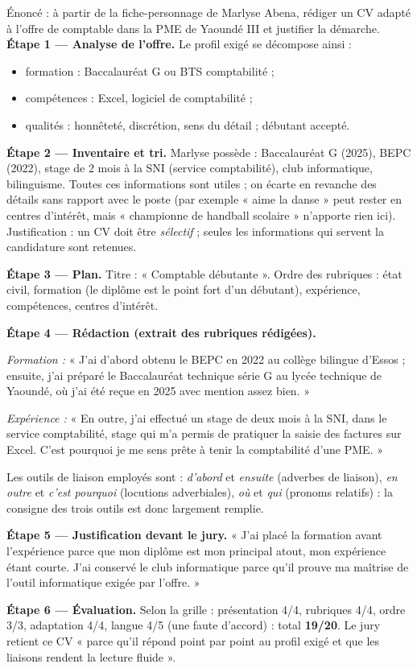 \documentclass[11pt]{article}
\newcounter{popsec}
\newcounter{popsub}
\newcommand{\courssub}[1]{%
  \stepcounter{popsub}%
  \par\vspace{9pt}\noindent{\popxbold\fontsize{11.5}{13}\selectfont\color{popink}{\color{poporange}\thepopsec.\thepopsub}\hspace{6pt}#1}\par\nopagebreak\vspace{4pt}
}
\begin{document}
\courssub{Démarche et corrigé commenté}

\begin{exoresolu}
Énoncé : à partir de la fiche-personnage de Marlyse Abena, rédiger un CV adapté à l'offre de comptable dans la PME de Yaoundé III et justifier la démarche.
\tcblower
\textbf{Étape 1 — Analyse de l'offre.} Le profil exigé se décompose ainsi :
\begin{itemize}
\item formation : Baccalauréat G ou BTS comptabilité ;
\item compétences : Excel, logiciel de comptabilité ;
\item qualités : honnêteté, discrétion, sens du détail ; débutant accepté.
\end{itemize}
\textbf{Étape 2 — Inventaire et tri.} Marlyse possède : Baccalauréat G (2025), BEPC (2022), stage de 2 mois à la SNI (service comptabilité), club informatique, bilinguisme. Toutes ces informations sont utiles ; on écarte en revanche des détails sans rapport avec le poste (par exemple « aime la danse » peut rester en centres d'intérêt, mais « championne de handball scolaire » n'apporte rien ici). Justification : un CV doit être \emph{sélectif} ; seules les informations qui servent la candidature sont retenues.
\par
\textbf{Étape 3 — Plan.} Titre : « Comptable débutante ». Ordre des rubriques : état civil, formation (le diplôme est le point fort d'un débutant), expérience, compétences, centres d'intérêt.
\par
\textbf{Étape 4 — Rédaction (extrait des rubriques rédigées).}
\par
\emph{Formation :} « J'ai d'abord obtenu le BEPC en 2022 au collège bilingue d'Essos ; ensuite, j'ai préparé le Baccalauréat technique série G au lycée technique de Yaoundé, où j'ai été reçue en 2025 avec mention assez bien. »
\par
\emph{Expérience :} « En outre, j'ai effectué un stage de deux mois à la SNI, dans le service comptabilité, stage qui m'a permis de pratiquer la saisie des factures sur Excel. C'est pourquoi je me sens prête à tenir la comptabilité d'une PME. »
\par
Les outils de liaison employés sont : \emph{d'abord} et \emph{ensuite} (adverbes de liaison), \emph{en outre} et \emph{c'est pourquoi} (locutions adverbiales), \emph{où} et \emph{qui} (pronoms relatifs) : la consigne des trois outils est donc largement remplie.
\par
\textbf{Étape 5 — Justification devant le jury.} « J'ai placé la formation avant l'expérience parce que mon diplôme est mon principal atout, mon expérience étant courte. J'ai conservé le club informatique parce qu'il prouve ma maîtrise de l'outil informatique exigée par l'offre. »
\par
\textbf{Étape 6 — Évaluation.} Selon la grille : présentation 4/4, rubriques 4/4, ordre 3/3, adaptation 4/4, langue 4/5 (une faute d'accord) : total \textbf{19/20}. Le jury retient ce CV « parce qu'il répond point par point au profil exigé et que les liaisons rendent la lecture fluide ».
\end{exoresolu}
\end{document}
